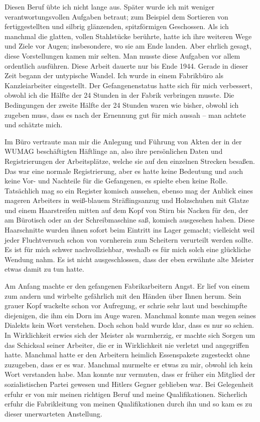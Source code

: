 \documentclass[a4paper,12pt,ngerman,
]{nisebook}
\begin{document}
Diesen Beruf übte ich nicht lange aus. Später wurde ich mit weniger verantwortungsvollen Aufgaben betraut; zum Beispiel dem Sortieren von fertiggestellten und silbrig glänzenden, spitzförmigen Geschossen. Als ich manchmal die glatten, vollen Stahlstücke berührte, hatte ich ihre weiteren Wege und Ziele vor Augen; insbesondere, wo sie am Ende landen. Aber ehrlich gesagt, diese Vorstellungen kamen mir selten. 
Man musste diese Aufgaben vor allem ordentlich ausführen. Diese Arbeit dauerte nur bis Ende 1944. Gerade in dieser Zeit begann der untypische Wandel. Ich wurde in einem Fabrikbüro als Kanzleiarbeiter eingestellt. Der Gefangenenstatus hatte sich für mich verbessert, obwohl ich die Hälfte der 24 Stunden in der Fabrik verbringen musste. Die Bedingungen der zweite Hälfte der 24 Stunden waren wie bisher, obwohl ich zugeben muss, dass es nach der Ernennung gut für mich aussah -- man achtete und schätzte mich.

Im Büro vertraute man mir die Anlegung und Führung von Akten der in der WUMAG beschäftigten Häftlinge an, also ihre persönlichen Daten und Registrierungen der Arbeitsplätze, welche sie auf den einzelnen Strecken besaßen. Das war eine normale Registrierung, aber es hatte keine Bedeutung und auch keine Vor- und Nachteile für die Gefangenen, es spielte eben keine Rolle.
Tatsächlich mag so ein Register komisch aussehen, ebenso mag der Anblick eines mageren Arbeiters in weiß-blauem Sträflingsanzug und Holzschuhen mit Glatze und einem Haarstreifen mitten auf dem Kopf von Stirn bis Nacken für den, der am Bürotisch oder an der Schreibmaschine saß, komisch ausgesehen haben. Diese Haarschnitte wurden ihnen sofort beim Eintritt ins Lager gemacht; vielleicht weil jeder Fluchtversuch schon von vornherein zum Scheitern verurteilt werden sollte.
Es ist für mich schwer nachvollziehbar, weshalb es für mich solch eine glückliche Wendung nahm. Es ist nicht ausgeschlossen, dass der eben erwähnte alte Meister etwas damit zu tun hatte.

Am Anfang machte er den gefangenen Fabrikarbeitern Angst. Er lief von einem zum andern und wirbelte gefährlich mit den Händen über Ihnen herum. Sein grauer Kopf wackelte schon vor Aufregung, er schrie sehr laut und beschimpfte diejenigen, die ihm ein Dorn im Auge waren. Manchmal konnte man wegen seines Dialekts kein Wort verstehen. Doch schon bald wurde klar, dass es nur so schien. 
In Wirklichkeit erwies sich der Meister als warmherzig, er machte sich Sorgen um das Schicksal seiner Arbeiter, die er in Wirklichkeit nie verletzt und angegriffen hatte. Manchmal hatte er den Arbeitern heimlich Essenspakete zugesteckt ohne zuzugeben, dass er es war. Manchmal murmelte er etwas zu mir, obwohl ich kein Wort verstanden habe. Man konnte nur vermuten, dass er früher ein Mitglied der sozialistischen Partei gewesen und Hitlers Gegner geblieben war. Bei Gelegenheit erfuhr er von mir  meinen richtigen Beruf und meine Qualifikationen. Sicherlich erfuhr die Fabrikleitung von meinen Qualifikationen durch ihn und so kam es zu dieser unerwarteten Anstellung.
\end{document}
